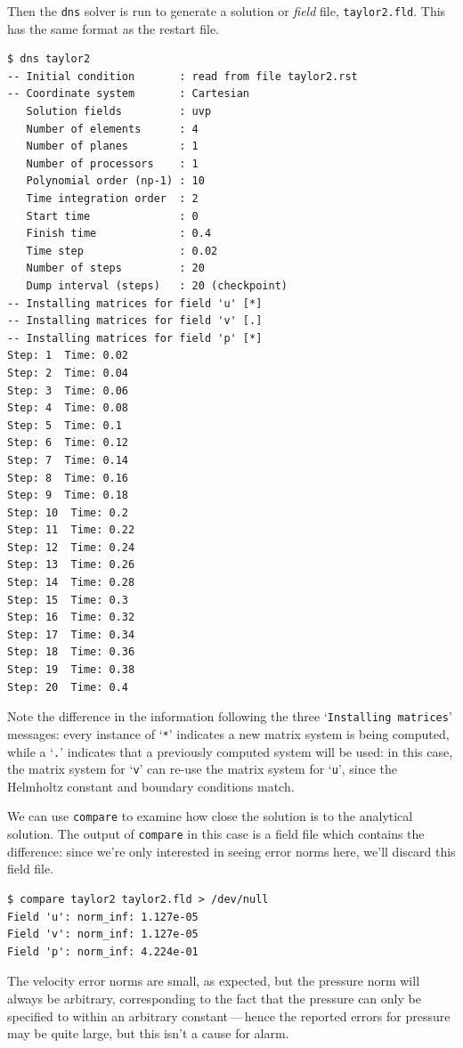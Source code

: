 \documentclass[11pt]{report}
\begin{document}
Then the \texttt{dns} solver is run to generate a solution or
\emph{field} file, \texttt{taylor2.fld}.  This has the same format
as the restart file.
{\small
\begin{verbatim}
$ dns taylor2
-- Initial condition       : read from file taylor2.rst
-- Coordinate system       : Cartesian
   Solution fields         : uvp
   Number of elements      : 4
   Number of planes        : 1
   Number of processors    : 1
   Polynomial order (np-1) : 10
   Time integration order  : 2
   Start time              : 0
   Finish time             : 0.4
   Time step               : 0.02
   Number of steps         : 20
   Dump interval (steps)   : 20 (checkpoint)
-- Installing matrices for field 'u' [*]
-- Installing matrices for field 'v' [.]
-- Installing matrices for field 'p' [*]
Step: 1  Time: 0.02
Step: 2  Time: 0.04
Step: 3  Time: 0.06
Step: 4  Time: 0.08
Step: 5  Time: 0.1
Step: 6  Time: 0.12
Step: 7  Time: 0.14
Step: 8  Time: 0.16
Step: 9  Time: 0.18
Step: 10  Time: 0.2
Step: 11  Time: 0.22
Step: 12  Time: 0.24
Step: 13  Time: 0.26
Step: 14  Time: 0.28
Step: 15  Time: 0.3
Step: 16  Time: 0.32
Step: 17  Time: 0.34
Step: 18  Time: 0.36
Step: 19  Time: 0.38
Step: 20  Time: 0.4
\end{verbatim}
}

Note the difference in the information following the three
`\verb|Installing matrices|' messages: every instance of `\verb|*|'
indicates a new matrix system is being computed, while a `\verb|.|'
indicates that a previously computed system will be used: in this
case, the matrix system for `\verb|v|' can re-use the matrix system
for `\verb|u|', since the Helmholtz constant and boundary conditions
match.

We can use \texttt{compare} to examine how close the solution is to the
analytical solution.  The output of \texttt{compare} in this case
is a field file which contains the difference: since we're only interested
in seeing error norms here, we'll discard this field file.
{\small
\begin{verbatim}
$ compare taylor2 taylor2.fld > /dev/null
Field 'u': norm_inf: 1.127e-05
Field 'v': norm_inf: 1.127e-05
Field 'p': norm_inf: 4.224e-01
\end{verbatim}
}
\noindent
The velocity error norms are small, as expected, but the pressure norm
will always be arbitrary, corresponding to the fact that the pressure
can only be specified to within an arbitrary constant\,---\,hence the
reported errors for pressure may be quite large, but this isn't a
cause for alarm.
\end{document}
